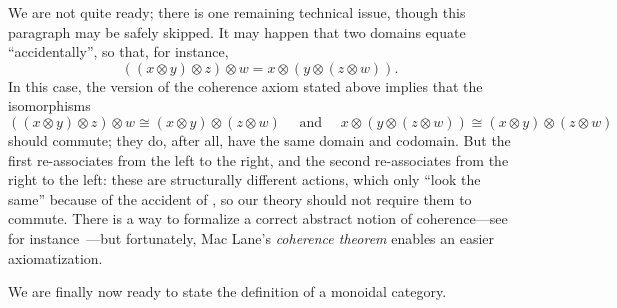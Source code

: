 We are not quite ready; there is one remaining technical issue, though this
paragraph may be safely skipped. It may happen that two
domains equate ``accidentally'', so that, for instance,
\begin{equation}\label{eqn:accidental equality}
  ((x\otimes y)\otimes z)\otimes w = x\otimes(y\otimes(z\otimes w)).
\end{equation}
In this case, the version of the coherence axiom stated above implies that the
isomorphisms \[
  ((x\otimes y)\otimes z)\otimes w \cong (x\otimes y)\otimes (z\otimes w)
  \quad\text{ and }\quad
  x\otimes(y\otimes(z\otimes w)) \cong (x\otimes y)\otimes (z\otimes w)
\] should commute; they do, after all, have the same domain and codomain. But
the first re-associates from the left to the right, and the second re-associates
from the right to the left: these are structurally different actions, which only
``look the same'' because of the accident of ,
so our theory should not require them to commute. There is a way to formalize
a correct abstract notion of coherence---see for instance~\cite[subsection
VII.2]{maclane-1971}---but fortunately, Mac Lane's \emph{coherence theorem}
enables an easier axiomatization.

We are finally now ready to state the definition of a monoidal category.

